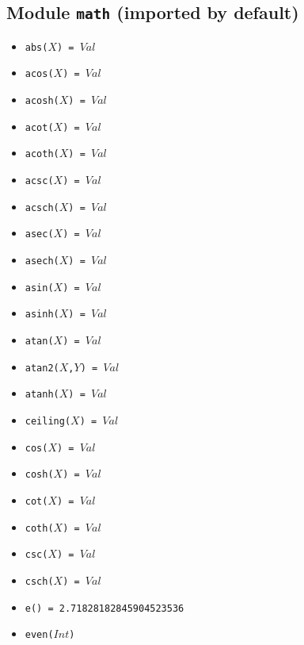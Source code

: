 \documentclass[10pt]{article}
\begin{document}
\begin{multicols}{2}
\section*{Module \texttt{math} (imported by default)}
\begin{scriptsize}
\begin{itemize}
   \item \texttt{abs($X$) = $Val$} 
   \item \texttt{acos($X$) = $Val$}
   \item \texttt{acosh($X$) = $Val$} 
   \item \texttt{acot($X$) = $Val$}
   \item \texttt{acoth($X$) = $Val$} 
   \item \texttt{acsc($X$) = $Val$} 
   \item \texttt{acsch($X$) = $Val$} 
   \item \texttt{asec($X$) = $Val$}
   \item \texttt{asech($X$) = $Val$} 
   \item \texttt{asin($X$) = $Val$}
   \item \texttt{asinh($X$) = $Val$} 
   \item \texttt{atan($X$) = $Val$}
   \item \texttt{atan2($X$,$Y$) = $Val$}
   \item \texttt{atanh($X$) = $Val$} 
   \item \texttt{ceiling($X$) = $Val$} 
   \item \texttt{cos($X$) = $Val$} 
   \item \texttt{cosh($X$)  = $Val$} 
   \item \texttt{cot($X$) = $Val$}
   \item \texttt{coth($X$)  = $Val$} 
   \item \texttt{csc($X$) = $Val$}
   \item \texttt{csch($X$)  = $Val$} 
   \item \texttt{e() = 2.71828182845904523536} 
   \item \texttt{even($Int$)} 

\end{itemize}
\end{scriptsize}
\end{multicols}
\end{document}
